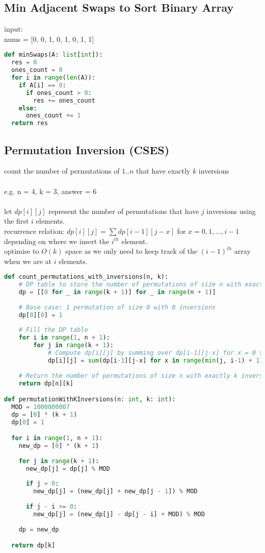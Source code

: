 \documentclass[11pt]{article}
\begin{document}
\subsection{Min Adjacent Swaps to Sort Binary Array}
input: \\
nums = [0, 0, 1, 0, 1, 0, 1, 1]\\
\begin{lstlisting}[language=Python]
def minSwaps(A: list[int]):
  res = 0
  ones_count = 0
  for i in range(len(A)): 
    if A[i] == 0:
      if ones_count > 0:
        res += ones_count
    else:
      ones_count += 1
  return res
\end{lstlisting}

\subsection{Permutation Inversion (CSES)}
count the number of permutations of $1..n$ that have exactly $k$ inversions\\\;\\
e.g. n = 4, k = 3, answer = 6\\\;\\
let $dp[i][j]$ represent the number of permutations that have $j$ inversions using the first $i$ elements.\\
recurrence relation: $dp[i][j] = \sum dp[i-1][j-x]$ for $x = 0, 1, ... , i-1$ depending on where we insert the $i^{th}$ element.\\
optimise to $O(k)$ space as we only need to keep track of the $(i-1)^{th}$ array when we are at $i$ elements.

\begin{lstlisting}[language=Python]
def count_permutations_with_inversions(n, k):
    # DP table to store the number of permutations of size n with exactly k inversions
    dp = [[0 for _ in range(k + 1)] for _ in range(n + 1)]
    
    # Base case: 1 permutation of size 0 with 0 inversions
    dp[0][0] = 1
    
    # Fill the DP table
    for i in range(1, n + 1):
        for j in range(k + 1):
            # Compute dp[i][j] by summing over dp[i-1][j-x] for x = 0 to min(j, i-1)
            dp[i][j] = sum(dp[i-1][j-x] for x in range(min(j, i-1) + 1))
    
    # Return the number of permutations of size n with exactly k inversions
    return dp[n][k]

def permutationWithKInversions(n: int, k: int):
  MOD = 1000000007
  dp = [0] * (k + 1)
  dp[0] = 1

  for i in range(1, n + 1):
    new_dp = [0] * (k + 1)
    
    for j in range(k + 1):
      new_dp[j] = dp[j] % MOD
      
      if j > 0:
        new_dp[j] = (new_dp[j] + new_dp[j - 1]) % MOD
        
      if j - i >= 0:
        new_dp[j] = (new_dp[j] - dp[j - i] + MOD) % MOD
        
    dp = new_dp

  return dp[k]

\end{lstlisting}
\end{document}
